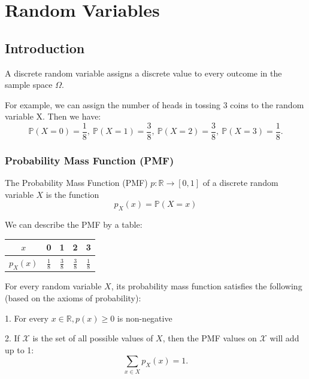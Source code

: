 \chapter{Random Variables}

\section{Introduction}
\begin{definition}
    A discrete random variable assigns a discrete value to every outcome in the sample space \(\Omega\). 
\end{definition}

For example, we can assign the number of heads in tossing 3 coins to the random variable X. Then we have: 
\[
  \mathbb{P}(X = 0) = \dfrac{1}{8},\ \mathbb{P}(X = 1) = \dfrac{3}{8},\ \mathbb{P}(X = 2) = \dfrac{3}{8},\ \mathbb{P}(X = 3) = \dfrac{1}{8}.
\]

\subsection{Probability Mass Function (PMF)}
\begin{definition}
  The Probability Mass Function (PMF) \(p: \mathbb{R} \to [0, 1]\) of a discrete random variable \(X\) is the function 
  \[
    p_X(x) = \mathbb{P}(X = x)
  \]
\end{definition}

We can describe the PMF by a table:
\begin{table}[H]
    \centering
    \begin{tabular}{c|c|c|c|c}
        \(x\)  & 0 & 1 & 2 & 3  \\
      \midrule
        \(p_X(x)\)  & \(\frac{1}{8}\) & \(\frac{3}{8}\) & \(\frac{3}{8}\) & \(\frac{1}{8}\)  \\
    \end{tabular}
\end{table}

For every random variable \(X\), its probability mass function satisfies the following (based on the axioms of probability):

1. For every \(x \in \mathbb{R}, p(x) \geq 0\) is non-negative

2. If \(\mathcal{X}\) is the set of all possible values of \(X\), then the PMF values on \(\mathcal{X}\) will add up to 1:
\[
  \sum_{x \in X} p_X(x) = 1. 
\]

